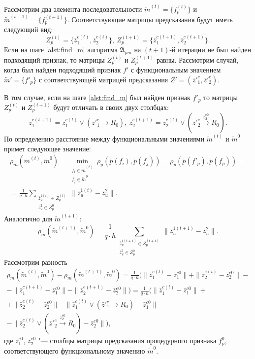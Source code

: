 \begin{Proof}
	Рассмотрим два элемента последовательности $\tilde m^{(t)}=\{f_p^{(t)}\}$ и $\tilde m^{(t+1)}=\{f_p^{(t+1)}\}$. Соответствующие матрицы предсказания будут иметь следующий вид:
	\begin{equation}
		Z_p^{(t)}=\{\bar z_1^{c(t)},\bar z_2^{e(t)}\},\ Z_p^{(t+1)}=\{\bar z_1^{c(t+1)},\bar z_2^{e(t+1)}\}.
	\end{equation}
	Если на шаге \ref{alst:find_m} алгоритма $\mathfrak A_{pm}$ на $(t+1)$-й итерации не был найден подходящий признак, то матрицы $Z_p^{(t)}$ и $Z_p^{(t+1)}$ равны. Рассмотрим случай, когда был найден подходящий признак $f'$ с функциональным значением $\tilde m'=\{f'_p\}$ с соответствующей матрицей предсказания $Z'=(\bar z'^c_1,\bar z'^e_2)$.
	
	В том случае, если на шаге \ref{alst:find_m} был найден признак $f'_p$ то матрицы $Z_p^{(t)}$ и $Z_p^{(t+1)}$ будут отличать в своих двух столбцах:
	\begin{equation}
		\bar z_1^{c(t+1)}=\bar z_1^{c(t)}\vee (\bar z'^c_1\rightarrow R_0),\ \bar z_2^{e(t+1)}=\bar z_2^{e(t)}\vee (\bar z'^e_2\xrightarrow{\bar z_2^{e0}} R_0).
	\end{equation}
	По определению расстояние между функциональными значениями $\tilde m^{(t)}$ и $\tilde m^0$ примет следующее значение:
	\begin{eqnarray}
		\rho_m(\tilde m^{(t)},\tilde m^0)=\min\limits_{\substack{f_i\in\tilde m^{(t)}\\f_j\in\tilde m^0}}\rho_p(\tilde p(f_i),\tilde p(f_j ))=\rho_p(\tilde p(f'_p),\tilde p(f_p))=\nonumber \\
		=\frac{1}{q\cdot h}\sum\limits_{\substack{\bar z_u^{1(t)}\in Z_p^{(t)}\\\bar z_u^2\in Z_p^0}}\|\bar z_u^{1(t)}-\bar z_u^2\|.
	\end{eqnarray}
	Аналогично для $\tilde m^{(t+1)}$:
	\begin{equation}
		\rho_m(\tilde m^{(t+1)},\tilde m^0)=\frac{1}{q\cdot h}\sum_{\substack{\bar z_u^{1(t+1)}\in Z_p^{(t+1)}\\\bar z_u^2\in Z_p^0}}\|\bar z_u^{1(t+1)}-\bar z_u^2\|.
	\end{equation}
	Рассмотрим разность 
	\begin{eqnarray}
		\rho_m(\tilde m^{(t)},\tilde m^0)-\rho_m(\tilde m^{(t+1)},\tilde m^0)=\frac{1}{q\cdot h}(\|\bar z_1^{c(t)}-\bar z_1^{c0}\|+\|\bar z_2^{e(t)}-\bar z_2^{e0}\|-\nonumber \\
		-\|\bar z_1^{c(t+1)}-\bar z_1^{c0}\|-\|\bar z_2^{e(t+1)}-\bar z_2^{e0}\|)=\frac{1}{q\cdot h}(\|\bar z_1^{c(t)}-\bar z_1^{c0}\|+\nonumber \\
		+\|\bar z_2^{e(t)}-\bar z_2^{e0}\|-\|\bar z_1^{c(t)}\vee (\bar z'^c_1\rightarrow R_0)-\bar z_1^{c0}\|-\nonumber \\
		-\|\bar z_2^{e(t)}\vee (\bar z'^e_2\xrightarrow{\bar z_2^{e0}} R_0)-\bar z_2^{e0}\|),
	\end{eqnarray}
	где $\bar z_1^{c0}$, $\bar z_2^{e0}$ "--- столбцы матрицы предсказания процедурного признака $f_p^0$, соответствующего функциональному значению $\tilde m^0$.
	

\end{Proof}
